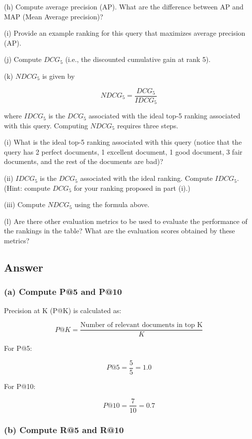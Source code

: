 \documentclass[a4paper, utf8]{ctexart}
\begin{document}
	(h) Compute average precision (AP). What are the difference between AP and MAP (Mean Average precision)? 
	
	(i) Provide an example ranking for this query that maximizes average precision (AP).
	
	(j) Compute $DCG_5$  (i.e., the discounted cumulative gain at rank 5).
	
	(k) $NDCG_5$ is given by
	
	\begin{equation}
		NDCG_5=\dfrac{DCG_5}{IDCG_5}
		\nonumber
	\end{equation}
	
	where $IDCG_5$ is the $DCG_5$ associated with the ideal top-5 ranking associated with this query. Computing $NDCG_5$ requires three steps.
	
	(i) What is the ideal top-5 ranking associated with this query (notice that the query has 2 perfect documents, 1 excellent document, 1 good document, 3 fair documents, and the rest of the documents are bad)? 
	
	(ii) $IDCG_5$ is the $DCG_5$ associated with the ideal ranking. Compute $IDCG_5$. (Hint: compute $DCG_5$ for your ranking proposed in part (i).) 
	
	(iii) Compute $NDCG_5$ using the formula above. 
	
	(l) Are there other evaluation metrics to be used to evaluate the performance of the rankings in the table? What are the evaluation scores obtained by these metrics?
	
	\subsection{Answer}
	
	\subsubsection*{(a) Compute P@5 and P@10}
	
	Precision at K (P@K) is calculated as:
	
	\[
	P@K = \frac{\text{Number of relevant documents in top K}}{K}
	\]
	
	For P@5:
	
	\[
	P@5 = \frac{5}{5} = 1.0
	\]
	
	For P@10:
	
	\[
	P@10 = \frac{7}{10} = 0.7
	\]
	
	\subsubsection*{(b) Compute R@5 and R@10}
	
\end{document}
